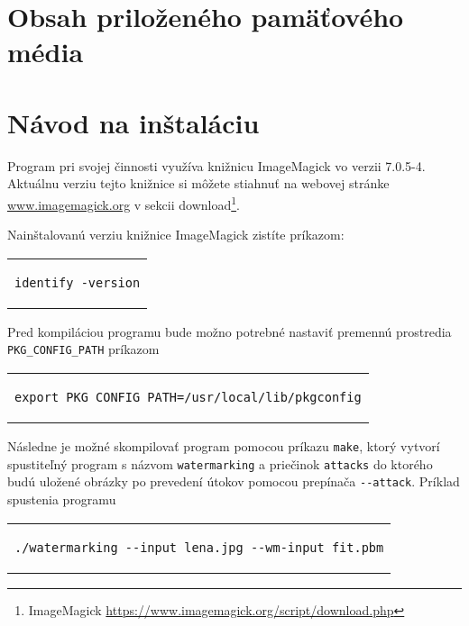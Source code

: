 
\chapter{Obsah priloženého pamäťového média}

\chapter{Návod na inštaláciu}
Program pri svojej činnosti využíva knižnicu ImageMagick vo verzii 7.0.5-4. Aktuálnu verziu tejto knižnice si môžete stiahnuť na webovej stránke \url{www.imagemagick.org} v sekcii download\footnote{ImageMagick \url{https://www.imagemagick.org/script/download.php}}.

Nainštalovanú verziu knižnice ImageMagick zistíte príkazom:
\begin{center}
\begin{tabular}{c}
\begin{lstlisting}
identify -version
\end{lstlisting}
\end{tabular}
\end{center}

Pred kompiláciou programu bude možno potrebné nastaviť premennú prostredia\\ \verb|PKG_CONFIG_PATH| príkazom
\begin{center}
\begin{tabular}{c}
\begin{lstlisting}
export PKG_CONFIG_PATH=/usr/local/lib/pkgconfig
\end{lstlisting}
\end{tabular}
\end{center}

Následne je možné skompilovať program pomocou príkazu {\tt make}, ktorý vytvorí spustiteľný program s názvom {\tt watermarking} a priečinok {\tt attacks} do ktorého budú uložené obrázky po prevedení útokov pomocou prepínača \verb|--attack|. Príklad spustenia programu
\begin{center}
\begin{tabular}{c}
\begin{lstlisting}
./watermarking --input lena.jpg --wm-input fit.pbm
\end{lstlisting}
\end{tabular}
\end{center}
